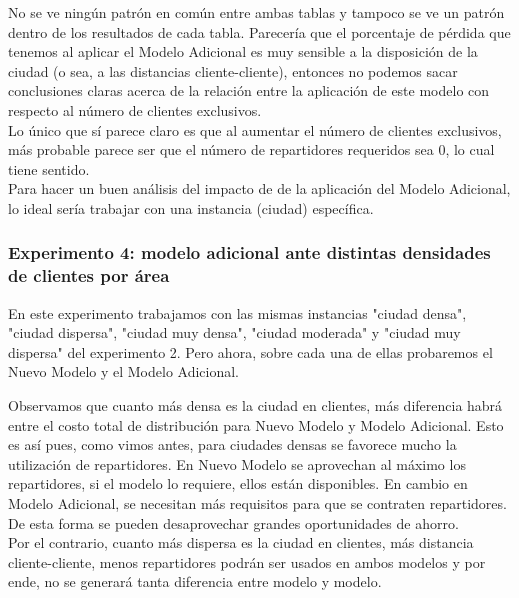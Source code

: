 \documentclass{article}
\begin{document}
No se ve ningún patrón en común entre ambas tablas y tampoco se ve un patrón dentro de los resultados de cada tabla. Parecería que el porcentaje de pérdida que tenemos al aplicar el Modelo Adicional es muy sensible a la disposición de la ciudad (o sea, a las distancias cliente-cliente), entonces no podemos sacar conclusiones claras acerca de la relación entre la aplicación de este modelo con respecto al número de clientes exclusivos. \\
Lo único que sí parece claro es que al aumentar el número de clientes exclusivos, más probable parece ser que el número de repartidores requeridos sea 0, lo cual tiene sentido. \\
Para hacer un buen análisis del impacto de de la aplicación del Modelo Adicional, lo ideal sería trabajar con una instancia (ciudad) específica.

\subsubsection{Experimento 4: modelo adicional ante distintas densidades de clientes por área}

En este experimento trabajamos con las mismas instancias "ciudad densa", "ciudad dispersa", "ciudad muy densa", "ciudad moderada" y "ciudad muy dispersa" del experimento 2. Pero ahora, sobre cada una de ellas probaremos el Nuevo Modelo y el Modelo Adicional. 

\begin{table}[H]
\centering
{}
\caption{Comparación de costos entre metodologías para distintas densidades de clientes por $km^{2}$}
\end{table}

Observamos que cuanto más densa es la ciudad en clientes, más diferencia habrá entre el costo total de distribución para Nuevo Modelo y Modelo Adicional. Esto es así pues, como vimos antes, para ciudades densas se favorece mucho la utilización de repartidores. En Nuevo Modelo se aprovechan al máximo los repartidores, si el modelo lo requiere, ellos están disponibles. En cambio en Modelo Adicional, se necesitan más requisitos para que se contraten repartidores. De esta forma se pueden desaprovechar grandes oportunidades de ahorro. \\
Por el contrario, cuanto más dispersa es la ciudad en clientes, más distancia cliente-cliente, menos repartidores podrán ser usados en ambos modelos y por ende, no se generará tanta diferencia entre modelo y modelo. 
\end{document}
